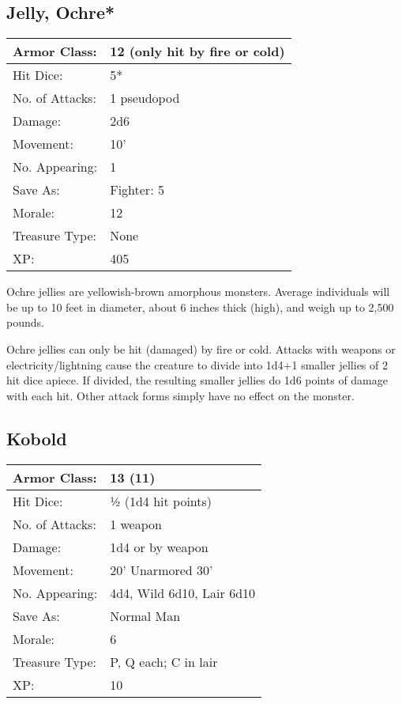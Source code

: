 \documentclass[a4paper,twoside,openany,10pt]{book}
\begin{document}
\begin{multicols}{2}
\subsection*{Jelly, Ochre*}\label{jelly-ochre}

\begin{tabularx}{0.50\textwidth}{@{}lX@{}}
Armor Class: & 12 (only hit by fire or cold) \\\hline
Hit Dice: & 5* \\\hline
No. of Attacks: & 1 pseudopod \\\hline
Damage: & 2d6 \\\hline
Movement: & 10' \\\hline
No. Appearing: & 1 \\\hline
Save As: & Fighter: 5 \\\hline
Morale: & 12 \\\hline
Treasure Type: & None \\\hline
XP: & 405 \\\hline
\end{tabularx}\medskip

Ochre jellies are yellowish-brown amorphous monsters. Average individuals will be up to 10 feet in diameter, about 6 inches thick (high), and weigh up to 2,500 pounds.

Ochre jellies can only be hit (damaged) by fire or cold. Attacks with weapons or electricity/lightning cause the creature to divide into 1d4+1 smaller jellies of 2 hit dice apiece. If divided, the resulting smaller jellies do 1d6 points of damage with each hit. Other attack forms simply have no effect on the monster.

\subsection*{Kobold}\label{kobold}

\begin{tabularx}{0.50\textwidth}{@{}lX@{}}
Armor Class: & 13 (11) \\\hline
Hit Dice: & ½ (1d4 hit points) \\\hline
No. of Attacks: & 1 weapon \\\hline
Damage: & 1d4 or by weapon \\\hline
Movement: & 20' Unarmored 30' \\\hline
No. Appearing: & 4d4, Wild 6d10, Lair 6d10 \\\hline
Save As: & Normal Man \\\hline
Morale: & 6 \\\hline
Treasure Type: & P, Q each; C in lair \\\hline
XP: & 10 \\\hline
\end{tabularx}\medskip


\end{multicols}
\end{document}
